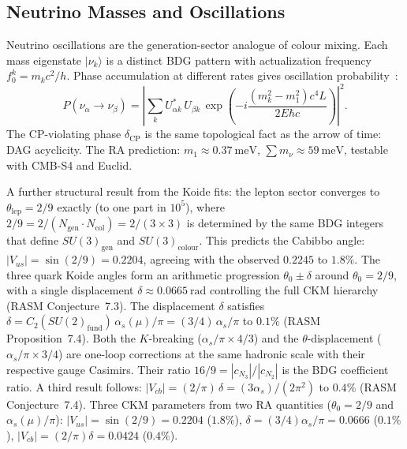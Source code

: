\documentclass[11pt,a4paper]{article}
\begin{document}
\subsection{Neutrino Masses and Oscillations}

Neutrino oscillations are the generation-sector analogue of colour mixing.
Each mass eigenstate $|\nu_k\rangle$ is a distinct BDG pattern with
actualization frequency $f_0^k = m_k c^2/h$. Phase accumulation at
different rates gives oscillation probability~\citep{Sandeman2026RASM}:
\begin{equation}
  P(\nu_\alpha \to \nu_\beta) = \left|\sum_k U^*_{\alpha k}\,U_{\beta k}
  \,\exp\!\left(-i\frac{(m_k^2 - m_1^2)c^4 L}{2E\hbar c}\right)\right|^2.
  \label{eq:osc}
\end{equation}
The CP-violating phase $\delta_{\mathrm{CP}}$ is the same topological fact
as the arrow of time: DAG acyclicity. The RA prediction:
$m_1 \approx 0.37~\mathrm{meV}$, $\sum m_\nu \approx 59~\mathrm{meV}$,
testable with CMB-S4 and Euclid.

A further structural result from the Koide fits: the lepton sector
converges to $\theta_{\mathrm{lep}} = 2/9$ exactly (to one part in
$10^5$), where $2/9 = 2/(N_{\mathrm{gen}}\cdot N_{\mathrm{col}}) =
2/(3\times 3)$ is determined by the same BDG integers that define
$SU(3)_{\mathrm{gen}}$ and $SU(3)_{\mathrm{colour}}$. This predicts
the Cabibbo angle: $|V_{us}| = \sin(2/9) = 0.2204$, agreeing with the
observed $0.2245$ to $1.8\%$. The three quark Koide angles form an
arithmetic progression $\theta_0 \pm \delta$ around $\theta_0 = 2/9$,
with a single displacement $\delta \approx 0.0665~\mathrm{rad}$
controlling the full CKM hierarchy (RASM Conjecture~7.3).
The displacement $\delta$ satisfies $\delta =
C_2(SU(2)_{\mathrm{fund}})\,\alpha_s(\mu)/\pi = (3/4)\,\alpha_s/\pi$
to $0.1\%$ (RASM Proposition~7.4). Both the $K$-breaking
($\alpha_s/\pi \times 4/3$) and the $\theta$-displacement
($\alpha_s/\pi \times 3/4$) are one-loop corrections at the same
hadronic scale with their respective gauge Casimirs.
Their ratio $16/9 = |c_{N_3}|/|c_{N_2}|$ is the BDG coefficient ratio.
A third result follows: $|V_{cb}| = (2/\pi)\,\delta =
(3\alpha_s)/(2\pi^2)$ to $0.4\%$ (RASM Conjecture~7.4).
Three CKM parameters from two RA quantities ($\theta_0=2/9$ and
$\alpha_s(\mu)/\pi$):
$|V_{us}| = \sin(2/9) = 0.2204$ ($1.8\%$),
$\delta = (3/4)\alpha_s/\pi = 0.0666$ ($0.1\%$),
$|V_{cb}| = (2/\pi)\delta = 0.0424$ ($0.4\%$).

\end{document}
